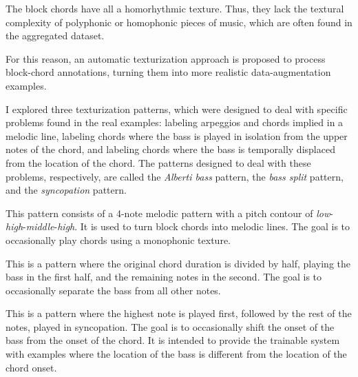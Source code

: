 
The block chords have all a homorhythmic texture. Thus, they
lack the textural complexity of polyphonic or homophonic
pieces of music, which are often found in the aggregated
dataset.

For this reason, an automatic texturization approach is
proposed to process block-chord annotations, turning them
into more realistic data-augmentation examples.

I explored three texturization patterns, which were designed
to deal with specific problems found in the real examples:
labeling arpeggios and chords implied in a melodic line,
labeling chords where the bass is played in isolation from
the upper notes of the chord, and labeling chords where the
bass is temporally displaced from the location of the chord.
The patterns designed to deal with these problems,
respectively, are called the \emph{Alberti bass} pattern,
the \emph{bass split} pattern, and the \emph{syncopation}
pattern.


This pattern consists of a 4-note melodic pattern with a
pitch contour of
\emph{low}-\emph{high}-\emph{middle}-\emph{high}. It is used
to turn block chords into melodic lines. The goal is to
occasionally play chords using a monophonic texture.



This is a pattern where the original chord duration is
divided by half, playing the bass in the first half, and the
remaining notes in the second. The goal is to occasionally
separate the bass from all other notes.



This is a pattern where the highest note is played first,
followed by the rest of the notes, played in syncopation.
The goal is to occasionally shift the onset of the bass from
the onset of the chord. It is intended to provide the
trainable system with examples where the location of the
bass is different from the location of the chord onset.


